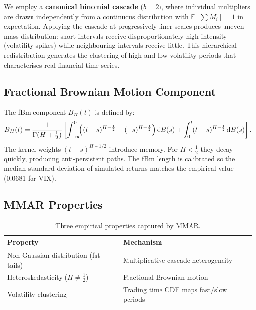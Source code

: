 \documentclass[12pt,a4paper]{article}
\begin{document}
We employ a \textbf{canonical binomial cascade} ($b = 2$), where
individual multipliers are drawn independently from a continuous
distribution with $\mathbb{E}[\sum M_i] = 1$ in expectation. Applying
the cascade at progressively finer scales produces uneven mass
distribution: short intervals receive disproportionately high intensity
(volatility spikes) while neighbouring intervals receive little. This
hierarchical redistribution generates the clustering of high and low
volatility periods that characterises real financial time series.

\subsection{Fractional Brownian Motion Component}

The fBm component $B_H(t)$ is defined by:
\begin{equation}
  B_H(t) = \frac{1}{\Gamma(H+\tfrac{1}{2})}
  \left[
    \int_{-\infty}^0 \!\!\Bigl((t-s)^{H-\frac{1}{2}} - (-s)^{H-\frac{1}{2}}\Bigr)
    \,\mathrm{d}B(s)
    + \int_0^t (t-s)^{H-\frac{1}{2}} \,\mathrm{d}B(s)
  \right].
  \label{eq:fbm}
\end{equation}
The kernel weights $(t-s)^{H-1/2}$ introduce memory. For
$H < \tfrac{1}{2}$ they decay quickly, producing anti-persistent
paths. The fBm length is calibrated so the median standard deviation
of simulated returns matches the empirical value (0.0681 for VIX).

\subsection{MMAR Properties}

\begin{table}[h!]
\centering
\begin{tabular}{ll}
\toprule
\textbf{Property} & \textbf{Mechanism} \\
\midrule
Non-Gaussian distribution (fat tails) & Multiplicative cascade heterogeneity \\
Heteroskedasticity ($H \neq \tfrac{1}{2}$) & Fractional Brownian motion \\
Volatility clustering & Trading time CDF maps fast/slow periods \\
\bottomrule
\end{tabular}
\caption{Three empirical properties captured by MMAR.}
\end{table}

\end{document}
